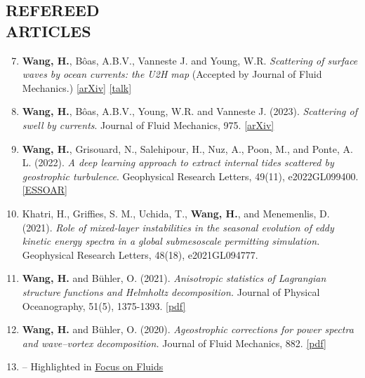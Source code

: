 \documentclass[margin]{res}
\newenvironment{benumerate}[1]{
    \let\oldItem\item
    \def\item{\addtocounter{enumi}{-2}\oldItem}
    \begin{enumerate}[leftmargin=*,noitemsep]
    \setcounter{enumi}{#1}
    \addtocounter{enumi}{1}
}{
    \end{enumerate}
}
\begin{document}
\begin{resume}
\section{{\normalfont REFEREED\\ARTICLES}}
\begin{benumerate}{6}
\item \textbf{Wang, H.}, B\^{o}as, A.B.V.,  Vanneste J. and Young, W.R. \textit{Scattering of surface waves by ocean currents: the U2H map}  (Accepted by Journal of Fluid Mechanics.) \href{https://arxiv.org/abs/2402.05652}{[arXiv]}
\href{https://www.youtube.com/watch?v=migsRGIAB-c}{[talk]}
\item \textbf{Wang, H.}, B\^{o}as, A.B.V., Young, W.R. and Vanneste J. (2023). \textit{Scattering of swell by currents}. Journal of Fluid Mechanics, 975.  \href{https://arxiv.org/abs/2305.12163}{[arXiv]}
\item \textbf{Wang, H.}, Grisouard, N., Salehipour, H., Nuz, A., Poon, M., and Ponte, A. L. (2022). \textit{A deep learning approach to extract internal tides scattered by geostrophic turbulence}. Geophysical Research Letters, 49(11), e2022GL099400. \href{https://essopenarchive.org/doi/full/10.1002/essoar.10508849.2}{[ESSOAR]}
\item Khatri, H., Griffies, S. M., Uchida, T., \textbf{Wang, H.},  and Menemenlis, D. (2021). \textit{Role of mixed-layer instabilities in the seasonal evolution of eddy kinetic energy spectra in a global submesoscale permitting simulation.} Geophysical Research Letters, 48(18), e2021GL094777.
\item \textbf{Wang, H.} and B{\"u}hler, O. (2021). \textit{Anisotropic statistics of Lagrangian structure functions and Helmholtz decomposition.} Journal of Physical Oceanography, 51(5), 1375-1393. \href{https://hannnwang.github.io/WangBuhlerJPO21.pdf}{[pdf]}
\item \textbf{Wang, H.} and B{\"u}hler, O. (2020). \textit{Ageostrophic corrections for power spectra and wave–vortex decomposition.} Journal of Fluid Mechanics, 882. \href{https://hannnwang.github.io/AgeoSpectraJFM20.pdf}{[pdf]}
\item[] -- Highlighted in \href{https://www.cambridge.org/core/journals/journal-of-fluid-mechanics/article/untangling-waves-and-vortices-in-the-atmospheric-kinetic-energy-spectra/1BEB1ABC32CD2CFAB99BAFEE4712CD0C}{Focus on Fluids}
\end{benumerate}


\end{resume}
\end{document}
